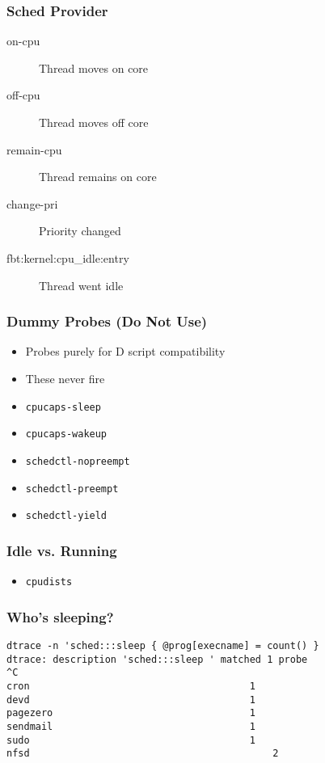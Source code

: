 \documentclass[pdftex]{beamer}
\begin{document}
\begin{frame}[fragile]
  \frametitle{Sched Provider}
  \begin{description}
  \item[on-cpu] Thread moves on core
  \item[off-cpu] Thread moves off core
  \item[remain-cpu] Thread remains on core
  \item[change-pri] Priority changed
  \item[fbt:kernel:cpu\_idle:entry] Thread went idle
  \end{description}
\end{frame}

\begin{frame}[fragile]
  \frametitle{Dummy Probes (Do Not Use)}
  \begin{itemize}
  \item Probes purely for D script compatibility
  \item These never fire
  \item \verb+cpucaps-sleep+
  \item \verb+cpucaps-wakeup+
  \item \verb+schedctl-nopreempt+
  \item \verb+schedctl-preempt+
  \item \verb+schedctl-yield+
  \end{itemize}
\end{frame}

\begin{frame}[fragile]
  \frametitle{Idle vs. Running}
  \begin{itemize}
  \item \verb+cpudists+
  \end{itemize}
\end{frame}

\begin{frame}[fragile]
  \frametitle{Who's sleeping?}
\begin{verbatim}
dtrace -n 'sched:::sleep { @prog[execname] = count() }
dtrace: description 'sched:::sleep ' matched 1 probe
^C
cron                                      1
devd                                      1
pagezero                                  1
sendmail                                  1
sudo                                      1
nfsd                                          2
\end{verbatim}
\end{frame}
\end{document}
